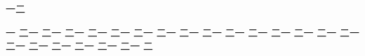 \documentclass{article}
\begin{document}
一二

一 二一 二一 二一 二一 二一 二一 二一 二一 二一 二一 二一 二一 二一 二一 二一 二一 二一 二一 二一 二一 二一 二
\end{document}

